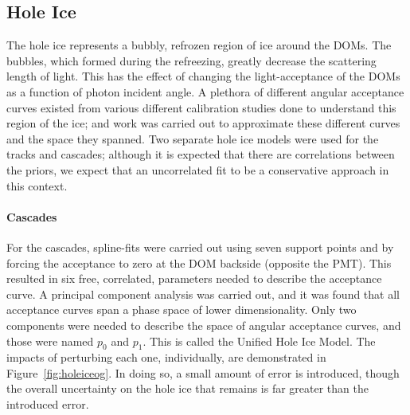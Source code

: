 \documentclass[main.tex]{subfiles}
\begin{document}
\subsection{Hole Ice}

The hole ice represents a bubbly, refrozen region of ice around the DOMs. 
The bubbles, which formed during the refreezing, greatly decrease the scattering length of light. 
This has the effect of changing the light-acceptance of the DOMs as a function of photon incident angle. 
A plethora of different angular acceptance curves existed from various different calibration studies done to understand this region of the ice; and work was carried out to approximate these different curves and the space they spanned. 
Two separate hole ice models were used for the tracks and cascades; although it is expected that there are correlations between the priors, we expect that an uncorrelated fit to be a conservative approach in this context.  

\paragraph{Cascades}

For the cascades, spline-fits were carried out using seven support points and by forcing the acceptance to zero at the DOM backside (opposite the PMT). 
This resulted in six free, correlated, parameters needed to describe the acceptance curve. 
A principal component analysis was carried out, and it was found that all acceptance curves span a phase space of lower dimensionality. 
Only two components were needed to describe the space of angular acceptance curves, and those were named $p_{0}$ and $p_{1}$.
This is called the Unified Hole Ice Model.
The impacts of perturbing each one, individually, are demonstrated in Figure~\ref{fig:holeiceog}. 
In doing so, a small amount of error is introduced, though the overall uncertainty on the hole ice that remains is far greater than the introduced error. 
\end{document}
